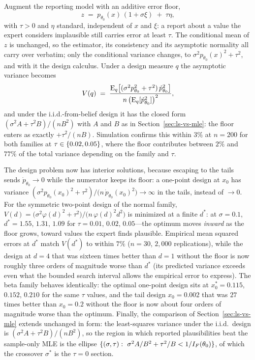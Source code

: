 \begin{remark}
\label{rem:floor}
Augment the reporting model with an additive error floor,
\[
z \;=\; p_{\theta_0}(x)\,(1+\sigma\xi)\;+\;\tau\eta,
\]
with $\tau>0$ and $\eta$ standard, independent of $x$ and $\xi$: a report about a value the expert considers implausible still carries error at least $\tau$. The conditional mean of $z$ is unchanged, so the estimator, its consistency and its asymptotic normality all carry over verbatim; only the conditional variance changes, to $\sigma^{2}p_{\theta_0}(x)^{2}+\tau^{2}$, and with it the design calculus. Under a design measure $q$ the asymptotic variance becomes
\[
V(q)\;=\;\frac{\mathrm{E}_q\big[(\sigma^{2}p_{\theta_0}^{2}+\tau^{2})\,\dot p_{\theta_0}^{2}\big]}{n\,\big(\mathrm{E}_q[\dot p_{\theta_0}^{2}]\big)^{2}},
\]
and under the i.i.d.-from-belief design it has the closed form $(\sigma^{2}A+\tau^{2}B)/(nB^{2})$ with $A$ and $B$ as in Section~\ref{sec:ls-vs-mle}: the floor enters as exactly $+\tau^{2}/(nB)$. Simulation confirms this within $3\%$ at $n=200$ for both families at $\tau\in\{0.02,0.05\}$, where the floor contributes between $2\%$ and $77\%$ of the total variance depending on the family and $\tau$.

The design problem now has interior solutions, because escaping to the tails sends $\dot p_{\theta_0}\to0$ while the numerator keeps its floor: a one-point design at $x_{0}$ has variance $(\sigma^{2}p_{\theta_0}(x_{0})^{2}+\tau^{2})/\big(n\,\dot p_{\theta_0}(x_{0})^{2}\big)\to\infty$ in the tails, instead of $\to0$. For the symmetric two-point design of the normal family, $V(d)=\big(\sigma^{2}\varphi(d)^{2}+\tau^{2}\big)/\big(n\,\varphi(d)^{2}d^{2}\big)$ is minimized at a finite $d^{\ast}$: at $\sigma=0.1$, $d^{\ast}=1.55$, $1.31$, $1.09$ for $\tau=0.01$, $0.02$, $0.05$---the optimum moves \emph{inward} as the floor grows, toward values the expert finds plausible. Empirical mean squared errors at $d^{\ast}$ match $V(d^{\ast})$ to within $7\%$ ($n=30$, $2{,}000$ replications), while the design at $d=4$ that was sixteen times better than $d=1$ without the floor is now roughly three orders of magnitude worse than $d^{\ast}$ (its predicted variance exceeds even what the bounded search interval allows the empirical error to express). The beta family behaves identically: the optimal one-point design sits at $x_{0}^{\ast}=0.115$, $0.152$, $0.210$ for the same $\tau$ values, and the tail design $x_{0}=0.002$ that was $27$ times better than $x_{0}=0.2$ without the floor is now about four orders of magnitude worse than the optimum. Finally, the comparison of Section~\ref{sec:ls-vs-mle} extends unchanged in form: the least-squares variance under the i.i.d.\ design is $(\sigma^{2}A+\tau^{2}B)/(nB^{2})$, so the region in which reported plausibilities beat the sample-only MLE is the ellipse $\set{(\sigma,\tau):\ \sigma^{2}A/B^{2}+\tau^{2}/B<1/I_F(\theta_0)}$, of which the crossover $\sigma^{\ast}$ is the $\tau=0$ section.
\end{remark}


